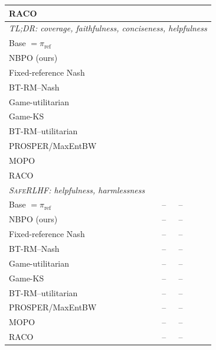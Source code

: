 \documentclass{article}
\theoremstyle{remark}
\theoremstyle{plain}
\newcommand{\piref}{\pi_{\mathrm{ref}}}
\newcommand{\NBPO}{\textsc{NBPO}}
\newcommand{\pending}{\textemdash}
\begin{document}
{\begin{table}[t]
\begin{tabular}{lcccccc}
RACO & \pending & \pending & \pending & \pending & \pending & \pending \\
\midrule
\multicolumn{7}{l}{\textit{\textsc{TL;DR}: coverage, faithfulness, conciseness, helpfulness}}\\
Base $=\piref$ & \pending & \pending & \pending & \pending & \pending & \pending \\
\NBPO{} (ours) & \pending & \pending & \pending & \pending & \pending & \pending \\
Fixed-reference Nash & \pending & \pending & \pending & \pending & \pending & \pending \\
BT-RM--Nash & \pending & \pending & \pending & \pending & \pending & \pending \\
Game-utilitarian & \pending & \pending & \pending & \pending & \pending & \pending \\
Game-KS & \pending & \pending & \pending & \pending & \pending & \pending \\
BT-RM--utilitarian & \pending & \pending & \pending & \pending & \pending & \pending \\
PROSPER/MaxEntBW & \pending & \pending & \pending & \pending & \pending & \pending \\
MOPO & \pending & \pending & \pending & \pending & \pending & \pending \\
RACO & \pending & \pending & \pending & \pending & \pending & \pending \\
\midrule
\multicolumn{7}{l}{\textit{\textsc{SafeRLHF}: helpfulness, harmlessness}}\\
Base $=\piref$ & \pending & \pending & -- & -- & \pending & \pending \\
\NBPO{} (ours) & \pending & \pending & -- & -- & \pending & \pending \\
Fixed-reference Nash & \pending & \pending & -- & -- & \pending & \pending \\
BT-RM--Nash & \pending & \pending & -- & -- & \pending & \pending \\
Game-utilitarian & \pending & \pending & -- & -- & \pending & \pending \\
Game-KS & \pending & \pending & -- & -- & \pending & \pending \\
BT-RM--utilitarian & \pending & \pending & -- & -- & \pending & \pending \\
PROSPER/MaxEntBW & \pending & \pending & -- & -- & \pending & \pending \\
MOPO & \pending & \pending & -- & -- & \pending & \pending \\
RACO & \pending & \pending & -- & -- & \pending & \pending \\
\bottomrule
\end{tabular}
\end{table}%
}
\end{document}
